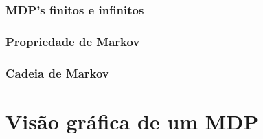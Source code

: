 \documentclass{article}
\begin{document}
        \subsubsection{MDP's finitos e infinitos}
        
        \subsubsection{Propriedade de Markov}
        
        \subsubsection{Cadeia de Markov}
    
\section{Visão gráfica de um MDP}
\end{document}
